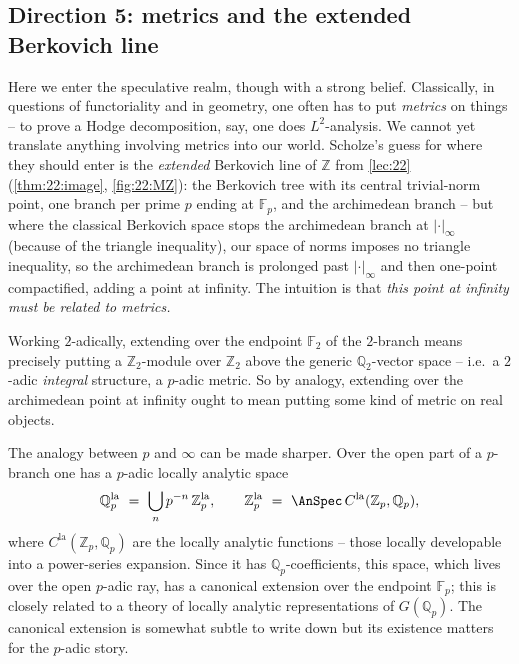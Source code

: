 \subsection{Direction 5: metrics and the extended Berkovich line}
\label{subsec:24:metrics}

Here we enter the speculative realm, though with a strong belief. Classically, in
questions of functoriality and in geometry, one often has to put \emph{metrics}
on things -- to prove a Hodge decomposition, say, one does $L^2$-analysis. We
cannot yet translate anything involving metrics into our world. Scholze's guess
for where they should enter is the \emph{extended} Berkovich line of $\mathbb Z$
from \cref{lec:22} (\cref{thm:22:image}, \cref{fig:22:MZ}): the Berkovich tree
with its central trivial-norm point, one branch per prime $p$ ending at
$\mathbb F_p$, and the archimedean branch -- but where the classical Berkovich
space stops the archimedean branch at $|\cdot|_\infty$ (because of the triangle
inequality), our space of norms imposes no triangle inequality, so the
archimedean branch is prolonged past $|\cdot|_\infty$ and then one-point
compactified, adding a point at infinity. The intuition is that
\emph{this point at infinity must be related to metrics.}

\begin{remark}
\label{rmk:24:metric-evidence}
Working $2$-adically, extending over the endpoint $\mathbb F_2$ of the
$2$-branch means precisely putting a $\mathbb Z_2$-module over $\mathbb Z_2$
above the generic $\mathbb Q_2$-vector space -- i.e.\ a $2$-adic
\emph{integral} structure, a $p$-adic metric. So by analogy, extending over the
archimedean point at infinity ought to mean putting some kind of metric on real
objects.
\end{remark}

The analogy between $p$ and $\infty$ can be made sharper. Over the open part of a
$p$-branch one has a $p$-adic locally analytic space
\begin{equation*}
\mathbb Q_p^{\mathrm{la}}\ =\ \bigcup_{n} p^{-n}\,\mathbb Z_p^{\mathrm{la}},
\qquad
\mathbb Z_p^{\mathrm{la}}\ =\ \AnSpec\, C^{\mathrm{la}}(\mathbb Z_p,\mathbb Q_p),
\end{equation*}
where $C^{\mathrm{la}}(\mathbb Z_p,\mathbb Q_p)$ are the locally analytic
functions -- those locally developable into a power-series expansion. Since it
has $\mathbb Q_p$-coefficients, this space, which lives over the open $p$-adic
ray, has a canonical extension over the endpoint $\mathbb F_p$; this is closely
related to a theory of locally analytic representations of $G(\mathbb Q_p)$. The
canonical extension is somewhat subtle to write down but its existence matters
for the $p$-adic story.

